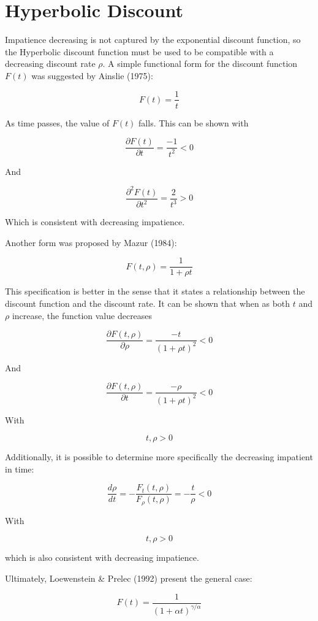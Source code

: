 \documentclass[]{article}
\begin{document}
\hypertarget{hyperbolic-discount}{%
\section{Hyperbolic Discount}\label{hyperbolic-discount}}

Impatience decreasing is not captured by the exponential discount function, so the Hyperbolic discount function must be used to be compatible with a decreasing discount rate \(\rho\). A simple functional form for the discount function \(F(t)\) was suggested by Ainslie (1975):

\[
F(t)= \frac{1}{t}
\]

As time passes, the value of \(F(t)\) falls. This can be shown with

\[
\frac{\partial F(t)}{\partial t}= \frac{-1}{t^2} <0
\]

And

\[
\frac{\partial^2 F(t)}{\partial t^2}= \frac{2}{t^3} > 0
\]

Which is consistent with decreasing impatience.

Another form was proposed by Mazur (1984):

\[
F(t, \rho)= \frac{1}{1 + \rho t}
\]

This specification is better in the sense that it states a relationship between the discount function and the discount rate. It can be shown that when as both \(t\) and \(\rho\) increase, the function value decreases

\[
\frac{\partial F(t, \rho)}{\partial \rho}= \frac{-t}{(1 + \rho t)^2} < 0 
\]

And

\[
\frac{\partial F(t, \rho)}{\partial t} = \frac{-\rho}{(1 + \rho t)^2} < 0 
\]

With

\[
t, \rho > 0
\]

Additionally, it is possible to determine more specifically the decreasing impatient in time:

\[
\frac{d \rho}{d t} = -\frac{F_{t}(t, \rho)}{F_{\rho}(t, \rho)} =  -\frac{t}{\rho} < 0
\]

With

\[
t, \rho > 0
\]

which is also consistent with decreasing impatience.

Ultimately, Loewenstein \& Prelec (1992) present the general case:

\[
F(t)= \frac{1}{(1 + \alpha t)^{\gamma/\alpha}} 
\]
\end{document}
